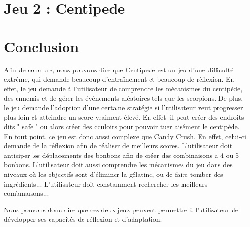 \documentclass[a4paper, 12pt, oneside]{article}
\begin{document}
\section{Jeu 2 : Centipede}


\section{Conclusion}
Afin de conclure, nous pouvons dire que Centipede est un jeu d'une difficulté extrême, qui demande beaucoup d'entraînement et beaucoup de réflexion. En effet, le jeu demande à l'utilisateur de comprendre les mécanismes du centipède, des ennemis et de gérer les événements aléatoires tels que les scorpions. De plus, le jeu demande l'adoption d'une certaine stratégie si l'utilisateur veut progresser plus loin et atteindre un score vraiment élevé. En effet, il peut créer des endroits dits " safe " ou alors créer des couloirs pour pouvoir tuer aisément le centipède. En tout point, ce jeu est donc aussi complexe que Candy Crush. En effet, celui-ci demande de la réflexion afin de réaliser de meilleurs scores. L'utilisateur doit anticiper les déplacements des bonbons afin de créer des combinaisons a 4 ou 5 bonbons. L'utilisateur doit aussi comprendre les mécanismes du jeu dans des niveaux où les objectifs sont d'éliminer la gélatine, ou de faire tomber des ingrédients... L'utilisateur doit constamment rechercher les meilleurs combinaisons... 

Nous pouvons donc dire que ces deux jeux peuvent permettre à l'utilisateur de développer ses capacités de réflexion et d'adaptation.
\end{document}
